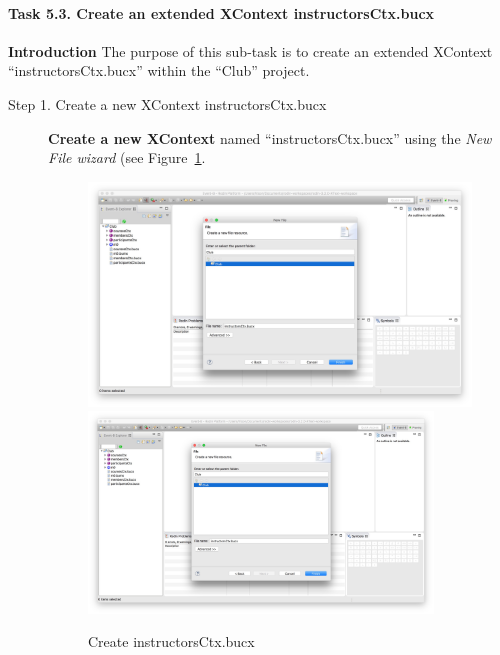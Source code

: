 \paragraph{Task 5.3. Create an extended XContext instructorsCtx.bucx}
\textbf{Introduction} The purpose of this sub-task is to create an extended XContext ``instructorsCtx.bucx'' within the ``Club'' project.
\begin{description}
\item[Step 1. Create a new XContext instructorsCtx.bucx] \textbf{Create a new XContext} named ``instructorsCtx.bucx'' using the \emph{New File wizard} (see Figure~\ref{fig:CreateInstructorsCtx}.
  \begin{figure}[!htbp]
    \centering
    \ifplastex
    \includegraphics[width=512]{figures/CreateInstructorsCtx}
    \else
    \includegraphics[width=0.9\textwidth]{figures/CreateInstructorsCtx}
    \fi
    \caption{Create instructorsCtx.bucx}
    \label{fig:CreateInstructorsCtx}
  \end{figure}


\end{description}
